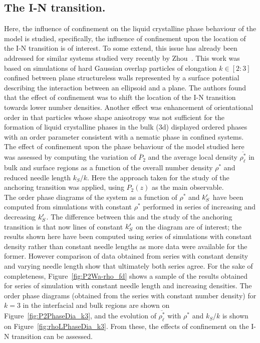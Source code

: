 \subsection{The I-N transition.}
\label{ss:surfInflINTans}

Here, the influence of confinement on the liquid crystalline phase behaviour of the model is
studied, specifically, the influence of confinement upon the location of the I-N transition is of
interest. To some extend, this issue has already been addressed for similar systems 
studied very recently by Zhou~\etal\cite{ZhouChen03}. This work was based on simulations of 
hard Gaussian overlap particles of elongation $k\in [2:3]$ confined between plane structureless
walls represented by a surface potential describing the interaction between an ellipsoid and 
a plane.
The authors found that the effect of confinement was to shift the location of the I-N transition
towards lower number densities. Another effect was enhancement of orientational order in that particles 
whose shape anisotropy was not sufficient for the formation of liquid crystalline phases in the
bulk (\ie 3d) displayed ordered phases with an order parameter consistent with a nematic 
phase in confined systems.\\

The effect of confinement upon the phase behaviour of the model studied here was assessed by
computing the variation of $\overline{P}_2$ and the average local density
$\overline{\rho^{*}_\ell}$ in bulk and surface regions as a function of the overall number density 
$\rho^{*}$ and reduced needle length $k_S/k$.
Here the  approach taken for the study of the anchoring transition was applied,
using $P_2(z)$ as the main observable.\\
The order phase diagrams of the system as a function of $\rho^{*}$ and $k_S^{\prime}$ have been
computed from simulations with constant $\rho^{*}$ performed in series of increasing and decreasing
$k_S^{\prime}$. The difference between this and the study of the anchoring transition is that now lines of
constant $k_S^{\prime}$ on the diagram are of interest;
the results shown here have been computed using series of simulations with constant density 
rather than constant needle lengths as more data were available for the former. 
However comparison of data obtained from series with constant density and varying needle length 
show that ultimately both series agree. For the sake of completeness, 
Figure~\ref{fig:P2Wa-rho_fd} shows a sample of the results obtained for series of simulation 
with constant needle length and increasing densities.
The order phase diagrams (obtained from the series with constant number density) 
for $k=3$ in the interfacial and bulk regions are shown on 
Figure~\ref{fig:P2PhaseDia_k3}, and the evolution of $\overline{\rho^{*}_\ell}$ with 
$\rho^{*}$ and $k_S/k$ is shown on Figure~\ref{fig:rhoLPhaseDia_k3}. 
From these, the effects of confinement on the I-N transition can be assessed.\\

